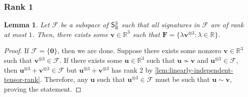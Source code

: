 \documentclass[11pt]{article}
\newtheorem{lemma}[theorem]{Lemma}
\newcommand{\teh}{^{\otimes 3}}
\begin{document}
\subsubsection{Rank 1}
\begin{lemma}\label{lem:subspace-rank-1}
Let $\mathscr{F}$ be a subspace of $\mathsf{S}^3_{\mathbb{R}}$ such that all signatures in $\mathscr{F}$ are of rank at most $1$.
Then, there exists some $\mathbf{v} \in \mathbb{R}^3$ such that $\mathbf{F} = \{\lambda \mathbf{v}\teh : \lambda \in \mathbb{R}\}$.
\end{lemma}
\begin{proof}
  If $\mathscr{F} = \{\mathbf{0}\}$, then we are done.
  Suppose there exists some nonzero $\mathbf{v} \in \mathbb{R}^3$ such that $\mathbf{v}\teh \in \mathscr{F}$.
  If there exists some $\mathbf{u} \in \mathbb{R}^3$ such that $\mathbf{u} \not \sim \mathbf{v}$ and $\mathbf{u}\teh \in \mathscr{F}$, then $\mathbf{u}\teh + \mathbf{v}\teh \in \mathscr{F}$ but $\mathbf{u}\teh + \mathbf{v}\teh$ has rank $2$ by \cref{lem:linearly-independent-tensor-rank}. 
  Therefore, any $\mathbf{u}$ such that $\mathbf{u}\teh \in \mathscr{F}$ must be such that $\mathbf{u} \sim \mathbf{v}$, proving the statement.
\end{proof}
\end{document}
